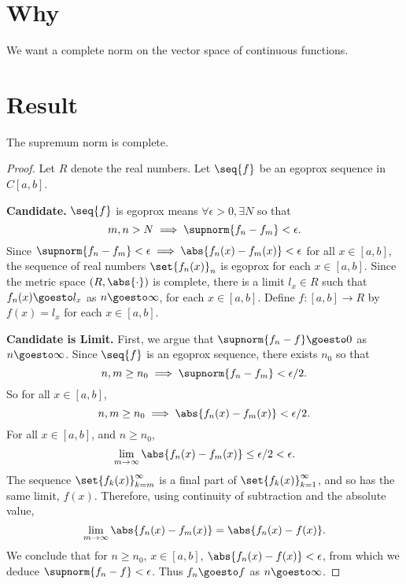 

\section*{Why}

We want a complete norm on the vector space of continuous functions.

\section*{Result}

\begin{proposition}
The supremum norm is complete.\end{proposition}
\begin{proof}Let $R$ denote the real numbers.
Let $\seq{f}$ be an egoprox sequence
in $C[a, b]$.

\textbf{Candidate.} $\seq{f}$ is egoprox means $\forall \epsilon > 0, \exists N$ so that
    \[
m, n > N \implies \supnorm{f_n - f_m} < \epsilon .
    \]
Since $\supnorm{f_n - f_m} < \epsilon  \implies \abs{f_n(x) - f_m(x)} < \epsilon $ for all $x \in [a, b]$, the sequence of real numbers $\set{f_n(x)}_n$ is egoprox for each $x \in [a, b]$.
Since the metric space $(R, \abs{\cdot })$ is complete, there is a limit $l_x \in R$ such that $f_n(x) \goesto l_x$ as $n \goesto \infty$, for each $x \in [a, b]$.
Define $f: [a, b] \to R$ by $f(x) = l_x$ for each $x \in [a, b]$.

\textbf{Candidate is Limit.}
First, we argue that
$\supnorm{f_n - f} \goesto 0$
as $n \goesto \infty$.
Since $\seq{f}$ is an egoprox sequence, there exists $n_0$ so that
    \[
n,m \geq n_0
\implies
\supnorm{f_n - f_m} < \epsilon /2.
    \]
So for all $x \in [a, b]$,
      \[
n,m \geq n_0
\implies
\abs{f_n(x) - f_m(x)} < \epsilon /2.
      \]
For all $x \in [a, b]$, and $n \geq n_0$,
      \[
\lim_{m \to \infty} \abs{f_n(x) - f_m(x)}
\leq \epsilon /2 < \epsilon .
      \]
The sequence
$\set{f_k(x)}_{k = m}^{\infty}$
is a final part of
$\set{f_k(x)}_{k = 1}^{\infty}$,
and so has the same limit, $f(x)$.
Therefore, using continuity
of subtraction and the absolute
value,
      \[
\lim_{m \to \infty}
\abs{f_n(x) - f_m(x)}
=
\abs{f_n(x) - f(x)}.
      \]
We conclude that for
$n \geq n_0$,
$x \in [a, b]$,
$\abs{f_n(x) - f(x)} < \epsilon $,
from which we deduce
$\supnorm{f_n - f} < \epsilon $.
Thus $f_n \goesto f$
as $n \goesto \infty$.


\end{proof}
